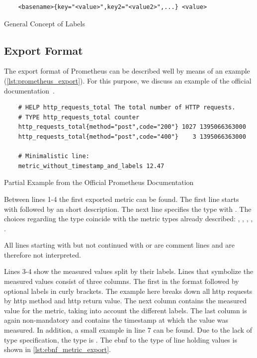 \begin{listing}[!ht]
	\begin{verbatim}
	<basename>{key="<value>",key2="<value2>",...} <value>
	\end{verbatim}
	\caption{General Concept of Labels}
	\label{lst:concept_label}
\end{listing}

\subsection{Export Format}
\label{subsec:Exportformat}

The export format of Prometheus can be described well by means of an example (\cref{lst:prometheus_export}). For this purpose, we discuss an example of the official documentation~\cite{PrometheusExpositionFormatBeispiel}.

\begin{listing}[!ht]
	\begin{verbatim}
	# HELP http_requests_total The total number of HTTP requests.
	# TYPE http_requests_total counter
	http_requests_total{method="post",code="200"} 1027 1395066363000
	http_requests_total{method="post",code="400"}    3 1395066363000
	
	# Minimalistic line:
	metric_without_timestamp_and_labels 12.47
	\end{verbatim}
	\caption{Partial Example from the Official Prometheus Documentation~\cite{PrometheusExpositionFormatBeispiel}}
	\label{lst:prometheus_export}
\end{listing}

Between lines 1-4 the first exported metric can be found. The first line starts with  followed by an short description. The next line specifies the type with . The choices regarding the type coincide with the metric types already described: , , , , .

All lines starting with \promcode{#} but not continued with  or  are comment lines and are therefore not interpreted.

Lines 3-4 show the measured values split by their labels. Lines that symbolize the measured values consist of three columns. The first in the format  followed by optional labels in curly brackets. The example here breaks down all \gls{http} requests by \gls{http} method and \gls{http} return value. The next column contains the measured value for the metric, taking into account the different labels. The last column is again non-mandatory and contains the timestamp at which the value was measured. 
In addition, a small example in line 7 can be found. Due to the lack of type specification, the type is . The \gls{ebnf} to the type of line holding values is shown in \cref{lst:ebnf_metric_export}.

